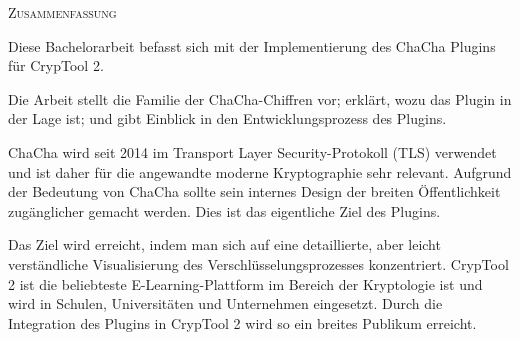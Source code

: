 \begin{center}
  \textsc{Zusammenfassung}
\end{center}
%
\noindent
Diese Bachelorarbeit befasst sich mit der Implementierung des ChaCha Plugins für CrypTool 2.

\medskip
\noindent
Die Arbeit stellt die Familie der ChaCha-Chiffren vor; erklärt, wozu das Plugin in der Lage ist; und gibt Einblick in den Entwicklungsprozess des Plugins.

\medskip
\noindent
ChaCha wird seit 2014 im Transport Layer Security-Protokoll (TLS) verwendet und ist daher für die angewandte moderne Kryptographie sehr relevant. Aufgrund der Bedeutung von ChaCha sollte sein internes Design der breiten Öffentlichkeit zugänglicher gemacht werden. Dies ist das eigentliche Ziel des Plugins.

\medskip
\noindent
Das Ziel wird erreicht, indem man sich auf eine detaillierte, aber leicht verständliche Visualisierung des Verschlüsselungsprozesses konzentriert.
CrypTool 2 ist die beliebteste E-Learning-Plattform im Bereich der Kryptologie ist und wird in Schulen, Universitäten und Unternehmen eingesetzt. Durch die Integration des Plugins in CrypTool 2 wird so ein breites Publikum erreicht.

